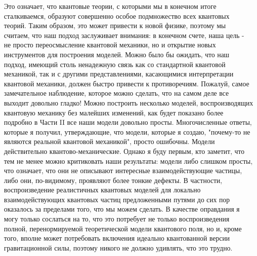 \documentclass[main.tex]{subfiles}
\begin{document}
Это означает, что квантовые теории, с которыми мы в конечном итоге сталкиваемся, образуют совершенно особое подмножество всех квантовых теорий. Таким образом, это может привести к новой физике, поэтому мы считаем, что наш подход заслуживает внимания: в конечном счете, наша цель - не просто переосмысление квантовой механики, но и открытие новых инструментов для построения моделей. Можно было бы ожидать, что наш подход, имеющий столь ненадежную связь как со стандартной квантовой механикой, так и с другими представлениями, касающимися интерпретации квантовой механики, должен быстро привести к противоречиям. Пожалуй, самое замечательное наблюдение, которое можно сделать, что на самом деле все выходит довольно гладко! Можно построить несколько моделей, воспроизводящих квантовую механику без малейших изменений, как будет показано более подробно в Части II все наши модели довольно просты. Многочисленные ответы, которые я получил, утверждающие, что модели, которые я создаю, "почему-то не являются реальной квантовой механикой", просто ошибочны. Модели действительно квантово-механические. Однако я буду первым, кто заметит, что тем не менее можно критиковать наши результаты: модели либо слишком просты, что означает, что они не описывают интересные взаимодействующие частицы, либо они, по-видимому, проявляют более тонкие дефекты. В частности, воспроизведение реалистичных квантовых моделей для локально взаимодействующих квантовых частиц предложенными путями до сих пор оказалось за пределами того, что мы можем сделать. В качестве оправдания я могу только сослаться на то, что это потребует не только воспроизведения полной, перенормируемой теоретической модели квантового поля, но и, кроме того, вполне может потребовать включения идеально квантованной версии гравитационной силы, поэтому никого не должно удивлять, что это трудно.
\end{document}
